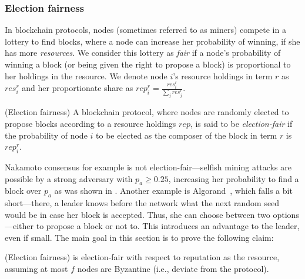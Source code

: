 \subsubsection*{Election fairness}
\label{section_voting_fairness}
In blockchain protocols, nodes (sometimes referred to as miners) compete in a lottery to find blocks, where a node can increase her probability of winning, if she has more \emph{resources}. We consider this lottery as \emph{fair} if a node's probability of winning a block (or being given the right to propose a block) is proportional to her holdings in the resource. We denote node $i$'s resource holdings in term $r$ as $res^r_i$ and her proportionate share as $rep^r_i = \frac{res^r_i}{\sum_j res^r_j}$.

\begin{definition}{(Election fairness)}
A blockchain protocol, where nodes are randomly elected to propose blocks according to a resource holdings $rep$, is said to be \emph{election-fair} if the probability of node $i$ to be elected as the composer of the block in term $r$ is $rep^r_i$.
\end{definition}

Nakamoto consensus for example is not election-fair---selfish mining attacks are possible by a strong adversary with $p_a \geq 0.25$, increasing her probability to find a block over $p_a$ as was shown in \cite{SelfishMining, SelfishMiningStrategies}. Another example is Algorand~\cite{AlgorandV9}, which falls a bit short---there, a leader knows before the network what the next random seed would be in case her block is accepted. Thus, she can choose between two options---either to propose a block or not to. This introduces an advantage to the leader, even if small. The main goal in this section is to prove the following claim:

\begin{claim}{(Election fairness)} \label{claim:ele_fair}
\name is election-fair with respect to reputation as the resource, assuming at most $f$ nodes are Byzantine (i.e., deviate from the protocol).
\end{claim}

